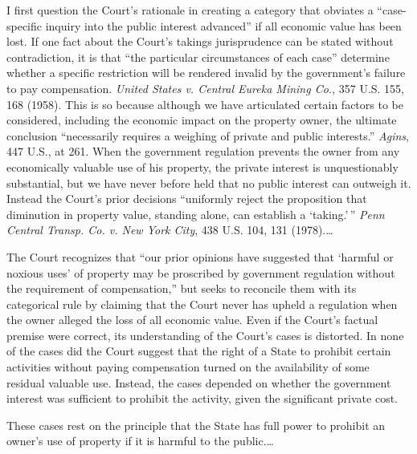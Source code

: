 I first question the Court's rationale in creating a category that obviates a
``case-specific inquiry into the public interest advanced'' if all economic
value has been lost. If one fact about the Court's takings jurisprudence can be
stated without contradiction, it is that ``the particular circumstances of each
case'' determine whether a specific restriction will be rendered invalid by the
government's failure to pay compensation. \textit{United States v. Central
Eureka Mining Co.}, 357 U.S. 155, 168 (1958). This is so because although we
have articulated certain factors to be considered, including the economic impact
on the property owner, the ultimate conclusion ``necessarily requires a weighing
of private and public interests.'' \textit{Agins}, 447 U.S., at 261. When the
government regulation prevents the owner from any economically valuable use of
his property, the private interest is unquestionably substantial, but we have
never before held that no public interest can outweigh it. Instead the Court's
prior decisions ``uniformly reject the proposition that diminution in property
value, standing alone, can establish a `taking.'\,'' \textit{Penn Central
Transp.
Co. v. New York City}, 438 U.S. 104, 131 (1978).\ldots

The Court recognizes that ``our prior opinions have suggested that `harmful or
noxious uses' of property may be proscribed by government regulation without the
requirement of compensation,'' but seeks to reconcile them with its categorical
rule by claiming that the Court never has upheld a regulation when the owner
alleged the loss of all economic value. Even if the Court's factual premise were
correct, its understanding of the Court's cases is distorted. In none of the
cases did the Court suggest that the right of a State to prohibit certain
activities without paying compensation turned on the availability of some
residual valuable use. Instead, the cases depended on whether the government
interest was sufficient to prohibit the activity, given the significant private
cost.

These cases rest on the principle that the State has full power to prohibit an
owner's use of property if it is harmful to the public.\ldots

